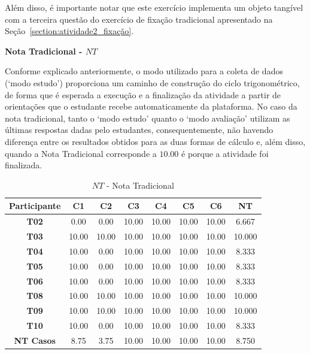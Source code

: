 Além disso, é importante notar que este exercício implementa um objeto tangível com a terceira questão do exercício de fixação tradicional apresentado na Seção~\ref{section:atividade2_fixação}.

\textbf{Nota Tradicional - $NT$}

Conforme explicado anteriormente, o modo utilizado para a coleta de dados (`modo estudo') proporciona um caminho de construção do ciclo trigonométrico, de forma que é esperada a execução e a finalização da atividade a partir de orientações que o estudante recebe automaticamente da plataforma. No caso da nota tradicional, tanto o `modo estudo' quanto o `modo avaliação' utilizam as últimas respostas dadas pelo estudantes, consequentemente, não havendo diferença entre os resultados obtidos para as duas formas de cálculo e, além disso, quando a Nota Tradicional corresponde a $10.00$ é porque a atividade foi finalizada.

\begin{table}[htbp]
	\centering
	\caption{$NT$ - Nota Tradicional}
	\begin{tabular}{|c|c|c|c|c|c|c|c|}
		\hline
		\rowcolor[HTML]{D9D9D9} 
		\cellcolor[HTML]{D0CECE}\textbf{Participante} & \textbf{C1} & \textbf{C2} & \textbf{C3} & \textbf{C4} & \textbf{C5} & \textbf{C6} & \textbf{NT} \\ \hline
		\textbf{T02}     & 0.00  & 0.00  & 10.00 & 10.00 & 10.00 & 10.00 & 6.667  \\ \hline
		\rowcolor[HTML]{F2F2F2} 
		\textbf{T03}     & 10.00 & 10.00 & 10.00 & 10.00 & 10.00 & 10.00 & 10.000 \\ \hline
		\textbf{T04}     & 10.00 & 0.00  & 10.00 & 10.00 & 10.00 & 10.00 & 8.333  \\ \hline
		\rowcolor[HTML]{F2F2F2} 
		\textbf{T05}     & 10.00 & 0.00  & 10.00 & 10.00 & 10.00 & 10.00 & 8.333  \\ \hline
		\textbf{T06}     & 10.00 & 0.00  & 10.00 & 10.00 & 10.00 & 10.00 & 8.333  \\ \hline
		\rowcolor[HTML]{F2F2F2} 
		\textbf{T08}     & 10.00 & 10.00 & 10.00 & 10.00 & 10.00 & 10.00 & 10.000 \\ \hline
		\textbf{T09}     & 10.00 & 10.00 & 10.00 & 10.00 & 10.00 & 10.00 & 10.000 \\ \hline
		\rowcolor[HTML]{EFEFEF} 
		\textbf{T10}     & 10.00 & 0.00  & 10.00 & 10.00 & 10.00 & 10.00 & 8.333  \\ \hline
		\rowcolor[HTML]{D0CECE} 
		\textbf{NT Casos} & 8.75  & 3.75  & 10.00 & 10.00 & 10.00 & 10.00 & 8.750   \\ \hline
	\end{tabular}
	\label{tab:F3_A3_NT}
\end{table}

